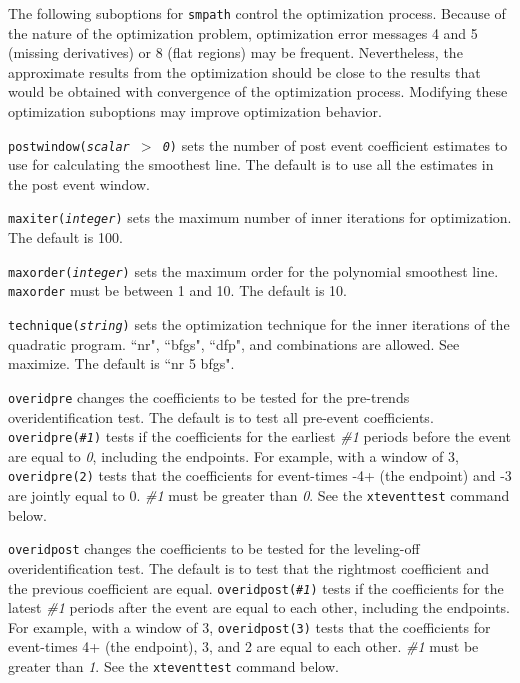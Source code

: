 \documentclass[bib]{./sty/statapress}
\begin{document}
\hangpara
The following suboptions for \texttt{smpath} control the optimization process. Because of the nature of the optimization problem, optimization error messages 4 and 5 (missing derivatives) or 8 (flat regions) may be frequent. Nevertheless, the approximate results from the optimization should be close to the results that would be obtained with convergence of the optimization process. Modifying these optimization suboptions may improve optimization behavior.

\morehangpara
\texttt{postwindow({\it scalar $>$ 0})} sets the number of post event coefficient estimates to use for calculating the smoothest line. The default is to use all the estimates in the post event window.

\morehangpara
\texttt{maxiter({\it integer})} sets the maximum number of inner iterations for optimization. The default is 100.

\morehangpara
\texttt{maxorder({\it integer})} sets the maximum order for the polynomial smoothest line. \texttt{maxorder} must be between 1 and 10. The default is 10.

\morehangpara
\texttt{technique({\it string})} sets the optimization technique for the inner iterations of the quadratic program.  ``nr", ``bfgs", ``dfp", and combinations are allowed. See maximize. The default is ``nr 5 bfgs".

\hangpara
\texttt{overidpre} changes the coefficients to be tested for the pre-trends overidentification test.
The default is to test all pre-event coefficients.
\texttt{overidpre({\it \#1})} tests if the coefficients for the earliest {\it \#1} periods before the event are equal to {\it 0}, including the endpoints.
For example, with a window of 3, \texttt{overidpre(2)} tests that the coefficients for event-times -4+ (the endpoint) and -3 are jointly equal to 0.
{\it \#1} must be greater than {\it 0}.
See the \texttt{xteventtest} command below.

\hangpara
\texttt{overidpost} changes the coefficients to be tested for the leveling-off overidentification test.
The default is to test that the rightmost coefficient and the previous coefficient are equal.
\texttt{overidpost({\it \#1})} tests if the coefficients for the latest {\it \#1} periods after the event are equal to each other, including the endpoints.
For example, with a window of 3, \texttt{overidpost(3)} tests that the coefficients for event-times 4+ (the endpoint), 3, and 2 are equal to each other.
{\it \#1} must be greater than {\it 1}.
See the \texttt{xteventtest} command below.
\end{document}

